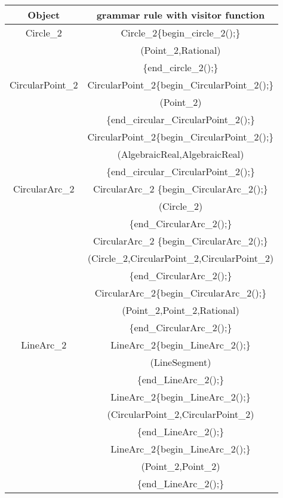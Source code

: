 \documentclass[10pt]{article}
\begin{document}
\begin{tabular}{|c|c|}  \hline Object & grammar rule with visitor function  \\ \hline
\hline\hline 
Circle\_2 &Circle\_2\{begin\_circle\_2();\}\\
          &(Point\_2,Rational)\\
 	  &\{end\_circle\_2();\}\\
\hline
CircularPoint\_2 &CircularPoint\_2\{begin\_CircularPoint\_2();\}\\
		      &(Point\_2)\\
		      &\{end\_circular\_CircularPoint\_2();\}\\
		      &CircularPoint\_2\{begin\_CircularPoint\_2();\}\\
		      &(AlgebraicReal,AlgebraicReal)\\
		      &\{end\_circular\_CircularPoint\_2();\}\\

\hline

 CircularArc\_2    & CircularArc\_2 \{begin\_CircularArc\_2();\}\\
      		   &(Circle\_2)\\
                   &\{end\_CircularArc\_2();\}\\
		   & CircularArc\_2 \{begin\_CircularArc\_2();\}\\
      		   &(Circle\_2,CircularPoint\_2,CircularPoint\_2)\\
                   &\{end\_CircularArc\_2();\}\\
		   & CircularArc\_2\{begin\_CircularArc\_2();\}\\
      		   &(Point\_2,Point\_2,Rational)\\
                   &\{end\_CircularArc\_2();\}\\

\hline

LineArc\_2  &LineArc\_2\{begin\_LineArc\_2();\}\\
            &(LineSegment)\\
            &\{end\_LineArc\_2();\}\\\
	    &LineArc\_2\{begin\_LineArc\_2();\}\\
            &(CircularPoint\_2,CircularPoint\_2)\\
            &\{end\_LineArc\_2();\}\\
	    &LineArc\_2\{begin\_LineArc\_2();\}\\
            &(Point\_2,Point\_2)\\
            &\{end\_LineArc\_2();\}\\
 \hline
\end{tabular}
\end{document}
